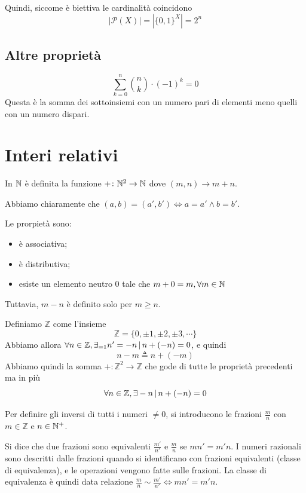 \documentclass[a4paper]{article}
\begin{document}
Quindi, siccome è biettiva le cardinalità coincidono \[ |\mathcal{P}(X)| = |{\{0,1\}}^X| = 2^n \]

\subsection{Altre proprietà}

\[
    \sum_{k=0}^n \binom{n}{k}\cdot {(-1)}^k = 0
\]
Questa è la somma dei sottoinsiemi con un numero pari di elementi meno quelli con un numero dispari.

\pagebreak

\section{Interi relativi}

In \(\mathbb{N}\) è definita la funzione \(+\colon {\mathbb{N}}^2 \to \mathbb{N}\)
dove \((m,n) \to m+n\).

Abbiamo chiaramente che \((a,b) = (a', b') \iff a=a' \land b=b'\).

Le prorpietà sono:
\begin{itemize}
    \item è associativa;
    \item è distributiva;
    \item esiste un elemento neutro \(0\) tale che \(m+0=m, \forall m \in \mathbb{N}\)
\end{itemize}

Tuttavia, \(m-n\) è definito solo per \(m \geq n\).

Definiamo \(\mathbb{Z}\) come l'insieme 
\[
    \mathbb{Z} = \{ 0, \pm 1, \pm 2, \pm 3, \cdots \}
\]
Abbiamo allora \(\forall n \in \mathbb{Z}, \exists_{=1} n'=-n \,|\, n+(-n) = 0\),
e quindi
\[
    n-m \triangleq n + (-m)
\]
Abbiamo quindi la somma \(+\colon {\mathbb{Z}}^2 \to \mathbb{Z}\)
che gode di tutte le proprietà precedenti ma in più 
\[
    \forall n \in \mathbb{Z}, \exists -n \,|\, n+(-n) = 0
\]

Per definire gli inversi di tutti i numeri \(\neq 0\), si introducono le frazioni \(\frac{m}{n}\)
con \(m\in\mathbb{Z}\) e \(n\in{\mathbb{N}}^+\).

Si dice che due frazioni sono equivalenti \(\frac{m'}{n'}\) e \(\frac{m}{n}\)
se \(mn' = m'n\).
I numeri razionali sono descritti dalle frazioni quando si identificano
con frazioni equivalenti (classe di equivalenza), e le operazioni vengono fatte sulle frazioni.
La classe di equivalenza è quindi data relazione \(\frac{m}{n} \sim \frac{m'}{n'} \iff mn'=m'n\).
\end{document}
